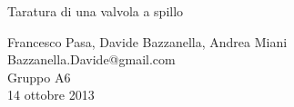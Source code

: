 \begin{center}

     	{\huge Taratura di una valvola a spillo}
	\vspace{0.3cm}

      	{\large Francesco Pasa, Davide Bazzanella, Andrea Miani} \\
      	{Bazzanella.Davide@gmail.com} \\
		{\large Gruppo A6} \\
	
	\vspace{0.2cm}
      	{\large 14 ottobre 2013}
    
    \vspace{0cm}

\end{center}
